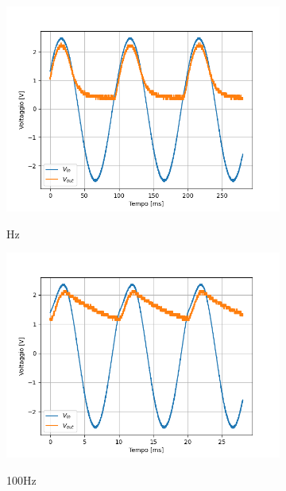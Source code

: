 \begin{figure}
	\centering
	\begin{subfigure}{0.32\textwidth}
		\includegraphics[width=\textwidth]{freq1.png}
		\label{d}
		\caption{\unit{\Hz}}
	\end{subfigure}
	\hfill
	\begin{subfigure}{0.32\textwidth}
		\includegraphics[width=\textwidth]{freq2.png}
		\label{h}
		\caption{100\unit{\Hz}}
	\end{subfigure}
	\hfill
	\begin{subfigure}{0.32\textwidth}

\end{subfigure}
\end{figure}
